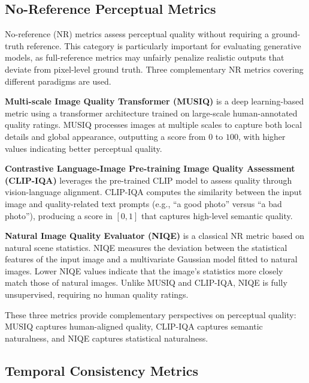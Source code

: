 \subsection{No-Reference Perceptual Metrics}
\label{subsec:nr_metrics}

No-reference (NR) metrics assess perceptual quality without 
requiring a ground-truth reference. This category is 
particularly important for evaluating generative models, as 
full-reference metrics may unfairly penalize realistic outputs 
that deviate from pixel-level ground truth. Three complementary 
NR metrics covering different paradigms are used.

\textbf{Multi-scale Image Quality Transformer (MUSIQ)} 
\cite{ke2021musiq} is a deep learning-based metric using a 
transformer architecture trained on large-scale 
human-annotated quality ratings. MUSIQ processes images at 
multiple scales to capture both local details and global 
appearance, outputting a score from $0$ to $100$, with higher 
values indicating better perceptual quality.

\textbf{Contrastive Language-Image Pre-training Image Quality 
Assessment (CLIP-IQA)} \cite{wang2023clipiqa} leverages the 
pre-trained CLIP model \cite{radford2021clip} to assess 
quality through vision-language alignment. CLIP-IQA computes 
the similarity between the input image and quality-related 
text prompts (e.g., ``a good photo'' versus ``a bad photo''), 
producing a score in $[0, 1]$ that captures high-level semantic 
quality.

\textbf{Natural Image Quality Evaluator (NIQE)} 
\cite{mittal2013niqe} is a classical NR metric based on natural 
scene statistics. NIQE measures the deviation between the 
statistical features of the input image and a multivariate 
Gaussian model fitted to natural images. Lower NIQE values 
indicate that the image's statistics more closely match those 
of natural images. Unlike MUSIQ and CLIP-IQA, NIQE is fully 
unsupervised, requiring no human quality ratings.

These three metrics provide complementary perspectives on 
perceptual quality: MUSIQ captures human-aligned quality, 
CLIP-IQA captures semantic naturalness, and NIQE captures 
statistical naturalness.


\subsection{Temporal Consistency Metrics}
\label{subsec:temporal_metrics}

